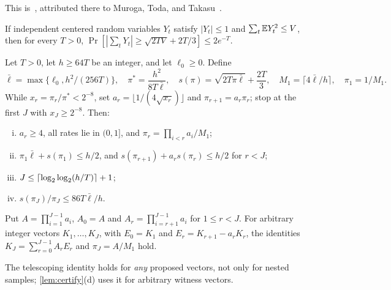 This is~\cite[Lemma~3.2]{CTW26}, attributed there to Muroga, Toda, and
Takasu~\cite{MTT61}.

\begin{imported}\label{imp:bernstein}
If independent centered random variables \(Y_t\) satisfy
\(|Y_t|\le1\) and \(\sum_t\mathbb E Y_t^2\le V\), then for every \(T>0\),
\(\Pr[|\sum_tY_t|\ge\sqrt{2TV}+2T/3]\le2e^{-T}\).
\end{imported}

\begin{imported}\label{imp:chain}
Let \(T>0\), let \(h\ge64T\) be an integer, and let \(\ell_0\ge0\).
Define
\[
 \bar\ell=\max\{\ell_0,h^2/(256T)\},\quad
 \pi^*=\frac{h^2}{8T\bar\ell},\quad
 s(\pi)=\sqrt{2T\pi\bar\ell}+\frac{2T}3,\quad
 M_1=\lceil4\bar\ell/h\rceil,\quad\pi_1=1/M_1 .
\]
While \(x_r=\pi_r/\pi^*<2^{-8}\), set \(a_r=\lfloor1/(4\sqrt{x_r})\rfloor\)
and \(\pi_{r+1}=a_r\pi_r\); stop at the first \(J\) with
\(x_J\ge2^{-8}\). Then:
\begin{enumerate}[(i)]
\item \(a_r\ge4\), all rates lie in \((0,1]\), and \(\pi_r=\prod_{i<r}a_i/M_1\);
\item \(\pi_1\bar\ell+s(\pi_1)\le h/2\), and
\(s(\pi_{r+1})+a_rs(\pi_r)\le h/2\) for \(r<J\);
\item \(J\le\lceil\log_2\log_2(h/T)\rceil+1\);
\item \(s(\pi_J)/\pi_J\le86T\bar\ell/h\).
\end{enumerate}
Put \(A=\prod_{i=1}^{J-1}a_i\), \(A_0=A\) and
\(A_r=\prod_{i=r+1}^{J-1}a_i\) for \(1\le r<J\). For arbitrary integer
vectors \(K_1,\dots,K_J\), with \(E_0=K_1\) and
\(E_r=K_{r+1}-a_rK_r\), the identities
\(K_J=\sum_{r=0}^{J-1}A_rE_r\) and \(\pi_J=A/M_1\) hold.
\end{imported}

The telescoping identity holds for \emph{any} proposed vectors, not
only for nested samples; \cref{lem:certify}(d) uses it for arbitrary witness vectors.


